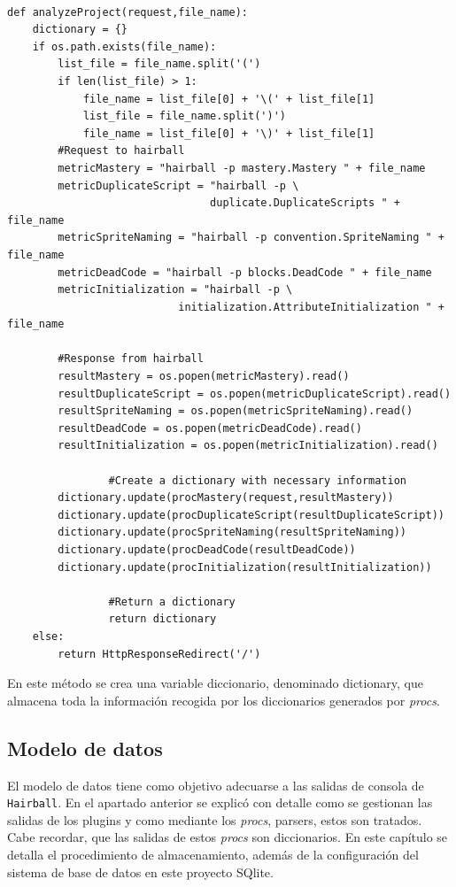 \documentclass[a4paper, 12pt]{book}
\begin{document}
\begingroup
\fontsize{7pt}{8pt}\selectfont
\begin{verbatim}

def analyzeProject(request,file_name):
    dictionary = {}
    if os.path.exists(file_name):
        list_file = file_name.split('(')
        if len(list_file) > 1:
            file_name = list_file[0] + '\(' + list_file[1]
            list_file = file_name.split(')')
            file_name = list_file[0] + '\)' + list_file[1]
        #Request to hairball
        metricMastery = "hairball -p mastery.Mastery " + file_name
        metricDuplicateScript = "hairball -p \
                                duplicate.DuplicateScripts " + file_name
        metricSpriteNaming = "hairball -p convention.SpriteNaming " + file_name
        metricDeadCode = "hairball -p blocks.DeadCode " + file_name 
        metricInitialization = "hairball -p \
                           initialization.AttributeInitialization " + file_name

        #Response from hairball
        resultMastery = os.popen(metricMastery).read()
        resultDuplicateScript = os.popen(metricDuplicateScript).read()
        resultSpriteNaming = os.popen(metricSpriteNaming).read()
        resultDeadCode = os.popen(metricDeadCode).read()
        resultInitialization = os.popen(metricInitialization).read()
        
				#Create a dictionary with necessary information
        dictionary.update(procMastery(request,resultMastery))
        dictionary.update(procDuplicateScript(resultDuplicateScript))
        dictionary.update(procSpriteNaming(resultSpriteNaming))
        dictionary.update(procDeadCode(resultDeadCode))
        dictionary.update(procInitialization(resultInitialization))
        
				#Return a dictionary
				return dictionary
    else:
        return HttpResponseRedirect('/')

\end{verbatim}
\endgroup

En este método se crea una variable diccionario, denominado dictionary, que almacena
toda la información recogida por los diccionarios generados por \emph{procs}. 


\subsection{Modelo de datos}

El modelo de datos tiene como objetivo adecuarse a las salidas de consola de 
\texttt{Hairball}. En el apartado anterior se explicó con detalle como se gestionan 
las salidas de los plugins y como mediante los \emph{procs}, parsers, estos son tratados.
Cabe recordar, que las salidas de estos \emph{procs} son diccionarios. En este capítulo
se detalla el procedimiento de almacenamiento, además de la configuración del sistema de 
base de datos en este proyecto SQlite. 
\end{document}
